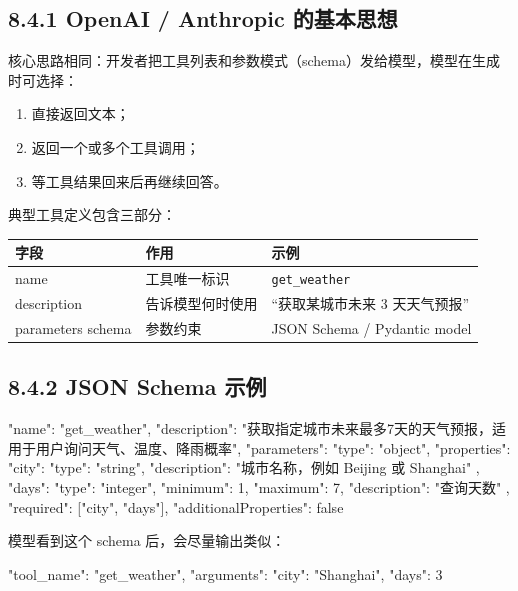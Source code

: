 \subsection{8.4.1 OpenAI / Anthropic 的基本思想}

核心思路相同：开发者把工具列表和参数模式（schema）发给模型，模型在生成时可选择：


\begin{enumerate}[leftmargin=2em]
\item 直接返回文本；
\item 返回一个或多个工具调用；
\item 等工具结果回来后再继续回答。
\end{enumerate}

典型工具定义包含三部分：


\begingroup
\scriptsize
\setlength{\tabcolsep}{3pt}
\begin{longtable}{|p{}|p{}|p{}|}
\hline
字段 & 作用 & 示例 \\ \hline
name & 工具唯一标识 & \texttt{get\_weather} \\ \hline
description & 告诉模型何时使用 & ``获取某城市未来 3 天天气预报'' \\ \hline
parameters schema & 参数约束 & JSON Schema / Pydantic model \\ \hline
\end{longtable}
\endgroup

\subsection{8.4.2 JSON Schema 示例}

\begin{codeblock}
{
  "name": "get_weather",
  "description": "获取指定城市未来最多7天的天气预报，适用于用户询问天气、温度、降雨概率",
  "parameters": {
    "type": "object",
    "properties": {
      "city": {
        "type": "string",
        "description": "城市名称，例如 Beijing 或 Shanghai"
      },
      "days": {
        "type": "integer",
        "minimum": 1,
        "maximum": 7,
        "description": "查询天数"
      }
    },
    "required": ["city", "days"],
    "additionalProperties": false
  }
}
\end{codeblock}

模型看到这个 schema 后，会尽量输出类似：


\begin{codeblock}
{
  "tool_name": "get_weather",
  "arguments": {
    "city": "Shanghai",
    "days": 3
  }
}
\end{codeblock}

